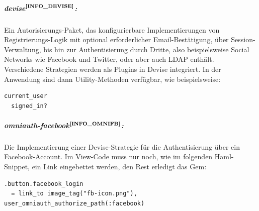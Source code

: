 \subparagraph{devise$^{\textbf{\ref{INFO_DEVISE}}}$:}%
\addtocounter{footnote}{1}%
Ein Autorisierungs-Paket, das konfigurierbare Implementierungen von Registrierungs-Logik mit optional erforderlicher Email-Bestätigung, über Session-Verwaltung, bis hin zur Authentisierung durch Dritte, also beispielsweise Social Networks wie Facebook und Twitter, oder aber auch LDAP enthält.\\
Verschiedene Strategien werden als Plugins in Devise integriert. In der Anwendung sind dann Utility-Methoden
verfügbar, wie beispielsweise:
\lstset{language=Ruby}
\begin{lstlisting}[frame=single,xleftmargin=0pt,numbers=none]
  current_user
  signed_in?
\end{lstlisting}
\subparagraph{omniauth-facebook$^{\textbf{\ref{INFO_OMNIFB}}}$:}%
\addtocounter{footnote}{1}%
Die Implementierung einer Devise-Strategie für die Authentisierung über ein Facebook-Account. Im View-Code muss nur noch, wie im folgenden Haml-Snippet, ein Link eingebettet werden, den Rest erledigt das Gem:
\begin{lstlisting}[frame=single,xleftmargin=0pt,numbers=none]
.button.facebook_login
  = link_to image_tag("fb-icon.png"), user_omniauth_authorize_path(:facebook)
\end{lstlisting}

